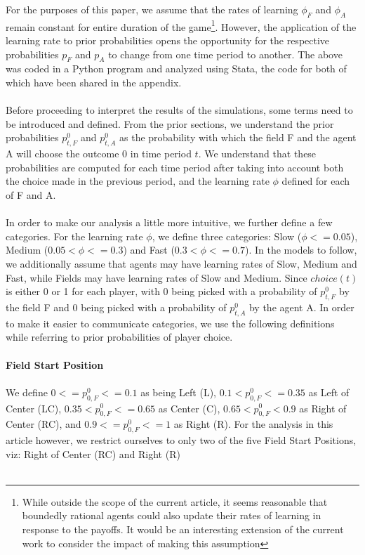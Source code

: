 \documentclass[12pt,letterpaper]{article}
\begin{document}
\noindent For the purposes of this paper, we assume that the rates of learning $\phi_F$ and $\phi_A$ remain constant for entire duration of the game\footnote{While outside the scope of the current article, it seems reasonable that boundedly rational agents could also update their rates of learning in response to the payoffs. It would be an interesting extension of the current work to consider the impact of making this assumption}. However, the application of the learning rate to prior probabilities opens the opportunity for the respective probabilities $p_F$ and $p_A$ to change from one time period to another. The above was coded in a Python program and analyzed using Stata, the code for both of which have been shared in the appendix.\\\\
Before proceeding to interpret the results of the simulations, some terms need to be introduced and defined. From the prior sections, we understand the prior probabilities $p_{t,F}^0$ and $p_{t,A}^0$ as the probability with which the field F and the agent A will choose the outcome 0 in time period $t$. We understand that these probabilities are computed for each time period after taking into account both the choice made in the previous period, and the learning rate $\phi$ defined for each of F and A. \\\\
In  order to make our analysis a little more intuitive, we further define a few categories. For the learning rate $\phi$, we define three categories: Slow ($\phi <= 0.05$), Medium ($0.05 < \phi <= 0.3$) and Fast  ($0.3 < \phi <= 0.7$). In the models to follow, we additionally assume that agents may have learning rates of Slow, Medium and Fast, while Fields may have learning rates of Slow and Medium. Since $choice(t)$ is either 0 or 1 for each player, with 0 being picked with a probability of $p_{t,F}^0$ by the field F and 0 being picked with a probability of $p_{t,A}^0$ by the agent A. In order to make it easier to communicate categories, we use the following definitions while referring to prior probabilities of player choice. \\\\
\textbf{Field Start Position}\\\\
We define $0 <= p_{0,F}^0 <= 0.1$ as being Left (L),  $0.1 < p_{0,F}^0 <= 0.35$ as Left of Center (LC), $0.35 < p_{0,F}^0 <= 0.65$ as Center (C),  $0.65 < p_{0,F}^0 < 0.9$ as  Right of Center (RC), and $0.9 <= p_{0,F}^0 <= 1$ as Right (R). For the analysis in this article however, we restrict ourselves to only two of the five Field Start Positions, viz: Right of Center (RC) and Right (R)\\\\
\end{document}
